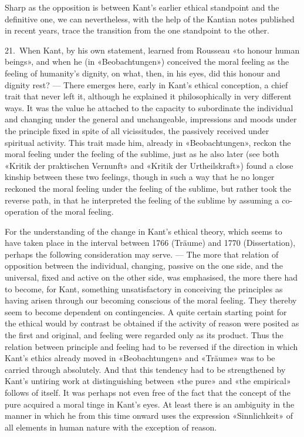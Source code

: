 \documentclass[12pt,a4paper]{article}
\newcommand{\opage}[1]{\marginnote{\footnotesize\textit{[#1]}}}
\begin{document}
\opage{41}Sharp as the opposition is between Kant's earlier ethical standpoint and the
definitive one, we can nevertheless, with the help of the Kantian notes
published in recent years, trace the transition from the one standpoint to
the other.

21.\ When Kant, by his own statement, learned from Rousseau «to honour human
beings», and when he (in «Beobachtungen») conceived the moral feeling as
the feeling of humanity's dignity, on what, then, in his eyes, did this
honour and dignity rest? --- There emerges here, early in Kant's ethical
conception, a chief trait that never left it, although he explained it
philosophically in very different ways. It was the value he attached to the
capacity to subordinate the individual and changing under the general and
unchangeable, impressions and moods under the principle fixed in spite of
all vicissitudes, the passively received under spiritual activity. This
trait made him, already in «Beobachtungen», reckon the moral feeling under
the feeling of the sublime, just as he also later (see both «Kritik der
praktischen Vernunft» and «Kritik der Urtheilskraft») found a close kinship
between these two feelings, though in such a way that he no longer reckoned
the moral feeling under the feeling of the sublime, but rather took the
reverse path, in that he interpreted the feeling of the sublime by assuming
a co-operation of the moral feeling.

For the understanding of the change in Kant's ethical theory, which seems to
have taken place in the interval between 1766 (Träume) and 1770
(Dissertation), perhaps the following consideration may serve. --- The more
that relation of opposition between the individual, changing, passive
on the one side, and the universal, fixed and active on the other side, was
emphasised, the more there had to become, for Kant, something unsatisfactory
in conceiving the principles as having arisen through our becoming conscious
of the moral feeling. They thereby seem to become dependent on
contingencies. A quite certain starting point for the ethical would by
contrast be obtained if the activity of reason were posited as the first and
original, and feeling were regarded only as its product. Thus the relation
between principle and feeling had to be reversed if the direction in which
Kant's ethics already moved in «Beobachtungen» and «Träume» was to be
carried through absolutely. And that this tendency had to be strengthened by
Kant's untiring work at distinguishing between «the pure» and «the
empirical» follows of itself. It was perhaps not even free of the fact that
the concept of the pure acquired a moral tinge in Kant's eyes. At least
there is an ambiguity in the manner in which he from this time onward uses
the expression «Sinnlichkeit» of all elements in human nature with the
exception of reason.
\end{document}
